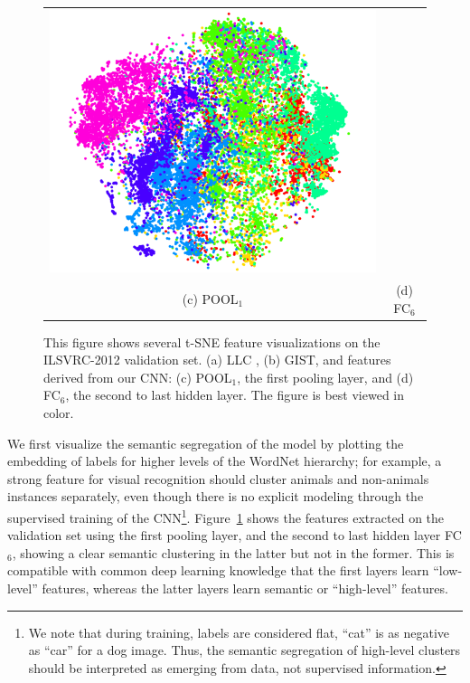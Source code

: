 \begin{figure}
\begin{tabular}{cc}
    \includegraphics[width=\fsize]{figs/decaf/fc6_quarter-fs8.png} \\
    (c) POOL$_1$ & (d) FC$_6$\\
  \end{tabular}
  \caption{This figure shows several t-SNE feature visualizations on the ILSVRC-2012 validation set. (a) LLC , (b) GIST, and features derived from our CNN: (c) POOL$_1$, the first pooling layer, and (d) FC$_6$, the second to last hidden layer. The figure is best viewed in color. \label{fig:embedding}}
\end{figure}

We first visualize the semantic segregation of the model by plotting
the embedding of labels for higher levels of the WordNet hierarchy;
for example, a strong feature for visual recognition should cluster
animals and non-animals instances separately, even though there is no
explicit modeling through the supervised training of the CNN\footnote{We note that during training, labels are considered flat, \ie ``cat'' is as negative as ``car'' for a dog image. Thus, the semantic segregation of high-level clusters should be interpreted as emerging from data, not supervised information.}.
 Figure~\ref{fig:embedding} shows the features extracted on the validation set using the first pooling layer, and the second to last hidden layer FC$_6$, showing a clear semantic clustering in the latter but not in the former. This is compatible with common deep learning knowledge that the first layers learn ``low-level'' features, whereas the latter layers learn semantic or ``high-level'' features.
 
